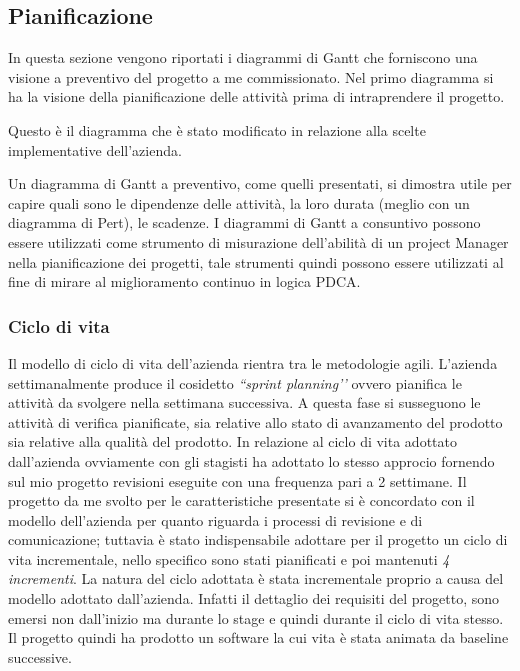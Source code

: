 \subsection{Pianificazione}
In questa sezione vengono riportati i diagrammi di Gantt che forniscono una visione a preventivo del progetto a me commissionato. Nel primo diagramma si ha la visione della pianificazione delle attivit\`{a} prima di intraprendere il progetto.

Questo \`{e} il diagramma che \`{e} stato modificato in relazione alla scelte implementative dell\textquoteright{}azienda.

Un diagramma di Gantt a preventivo, come quelli presentati, si dimostra utile per capire quali sono le dipendenze delle attivit\`{a}, la loro durata (meglio con un diagramma di Pert), le scadenze. I diagrammi di Gantt a consuntivo possono essere utilizzati come strumento di misurazione dell\textquoteright{}abilit\`{a} di un project Manager nella pianificazione dei progetti, tale strumenti quindi possono essere utilizzati al fine di mirare al miglioramento continuo in logica PDCA.

\subsubsection{Ciclo di vita}
Il modello di ciclo di vita dell\textquoteright{}azienda rientra tra le metodologie agili. L\textquoteright{}azienda settimanalmente produce il cosidetto \textit{``sprint planning\textquoteright{}\textquoteright{}} ovvero pianifica le attivit\`{a} da svolgere nella settimana successiva. A questa fase si susseguono le attivit\`{a} di verifica pianificate, sia relative allo stato di avanzamento del prodotto sia relative alla qualit\`{a} del prodotto. In relazione al ciclo di vita adottato dall\textquoteright{}azienda ovviamente con gli stagisti ha adottato lo stesso approcio fornendo sul mio progetto revisioni eseguite con una frequenza pari a 2 settimane. Il progetto da me svolto per le caratteristiche presentate si \`{e} concordato con il modello dell\textquoteright{}azienda per quanto riguarda i processi di revisione e di comunicazione; tuttavia \`{e} stato indispensabile adottare per il progetto un ciclo di vita incrementale, nello specifico sono stati pianificati e poi mantenuti \textit{4 incrementi}. La natura del ciclo adottata \`{e} stata incrementale proprio a causa del modello adottato dall\textquoteright{}azienda. Infatti il dettaglio dei requisiti del progetto, sono emersi non dall\textquoteright{}inizio ma durante lo stage e quindi durante il ciclo di vita stesso. Il progetto quindi ha prodotto un software la cui vita \`{e} stata animata da baseline successive.